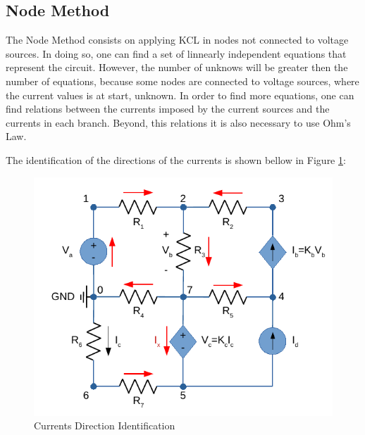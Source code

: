 \subsection{Node Method}
\label{subsec:Node Method}\par
The Node Method consists on applying KCL in nodes not connected to voltage sources. In doing so, one can find a set of linnearly independent equations that represent the circuit. However, the number of unknows will be greater then the number of equations, because some nodes are connected to voltage sources, where the current values is at start, unknown. In order to find more equations, one can find relations between the currents imposed by the current sources and the currents in each branch. Beyond, this relations it is also necessary to use Ohm's Law.\par
The identification of the directions of the currents is shown bellow in Figure \ref{fig:NodeMethod}:


\begin{figure}[h] \centering
  \includegraphics[width=0.7\linewidth]{NodeMethod.pdf}
  \caption{Currents Direction Identification}
  \label{fig:NodeMethod}
\end{figure}

